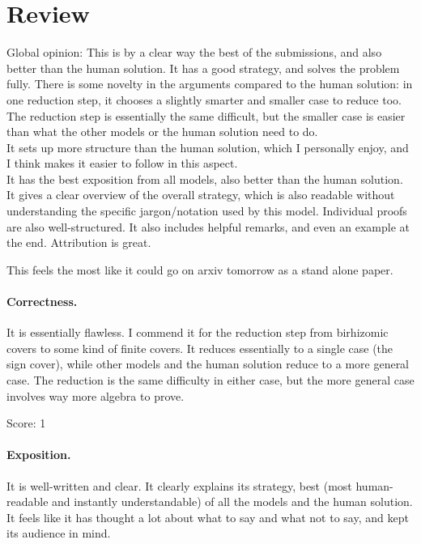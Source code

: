 \documentclass[11pt]{article}
\theoremstyle{definition}
\theoremstyle{remark}
\begin{document}
\maketitle


\section{Review}

Global opinion: This is by a clear way the best of the submissions, and also better than the human solution. It has a good strategy, and solves the problem fully. There is some novelty in the arguments compared to the human solution: in one reduction step, it chooses a slightly smarter and smaller case to reduce too. The reduction step is essentially the same difficult, but the smaller case is easier than what the other models or the human solution need to do.\\
It sets up more structure than the human solution, which I personally enjoy, and I think makes it easier to follow in this aspect. \\
It has the best exposition from all models, also better than the human solution. It gives a clear overview of the overall strategy, which is also readable without understanding the specific jargon/notation used by this model. Individual proofs are also well-structured. It also includes helpful remarks, and even an example at the end.
Attribution is great.

This feels the most like it could go on arxiv tomorrow as a stand alone paper.

\paragraph{Correctness.}

It is essentially flawless. I commend it for the reduction step from birhizomic covers to some kind of finite covers. It reduces essentially to a single case (the sign cover), while other models and the human solution reduce to a more general case. The reduction is the same difficulty in either case, but the more general case involves way more algebra to prove.

\noindent Score: 1

\paragraph{Exposition.}
It is well-written and clear. It clearly explains its strategy, best (most human-readable and instantly understandable) of all the models and the human solution. It feels like it has thought a lot about what to say and what not to say, and kept its audience in mind.
\end{document}
